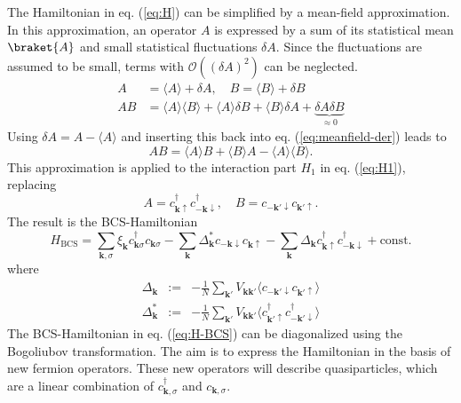 The Hamiltonian in eq. (\ref{eq:H}) can be simplified by a mean-field approximation. In this approximation, an operator $A$ is expressed by a sum of its statistical mean $\braket{A}$ and small statistical fluctuations $\delta A$. Since the fluctuations are assumed to be small, terms with $\mathcal{O}((\delta A)^2)$ can be neglected.
\begin{align}
A &= \langle A \rangle + \delta A, \quad B = \langle B \rangle + \delta B  \nonumber \\
A B &= \langle A \rangle  \langle B \rangle  + \langle A \rangle  \delta B +  \langle B \rangle \delta A + \underbrace{\delta A \delta B}_{\approx 0}\label{eq:meanfield-der}
\end{align}
Using $\delta A = A - \langle A \rangle$ and inserting this back into eq. (\ref{eq:meanfield-der}) leads to
\begin{equation}
AB = \langle A \rangle B + \langle B \rangle A - \langle A \rangle \langle B \rangle.\label{eq:meanfield-ab}
\end{equation}
This approximation is applied to the interaction part $H_1$ in eq. (\ref{eq:H1}), replacing
\begin{equation}
A = c^{\dagger}_{\mathbf{k} \uparrow }c^{\dagger}_{- \mathbf{k} \downarrow}, \quad B =  c_{- \mathbf{k'} \downarrow} c_{\mathbf{k'} \uparrow} .
\end{equation}
The result is the BCS-Hamiltonian
\begin{equation}
H_{\text{BCS}} = \sum_{\mathbf{k}, \sigma} \xi_{\mathbf{k}} c^{\dagger}_{\mathbf{k} \sigma }c_{\mathbf{k} \sigma }    -  \sum_{\mathbf{k}} \Delta_{\mathbf{k}}^* c_{-\mathbf{k} \downarrow} c_{\mathbf{k} \uparrow}  - \sum_{\mathbf{k}} \Delta_{\mathbf{k}}  c^{\dagger}_{\mathbf{k} \uparrow} c^{\dagger}_{- \mathbf{k} \downarrow} + \text{const.}\label{eq:H-BCS}
\end{equation}
where 
\begin{eqnarray}
\Delta_{\mathbf{k}} &:=& - \frac{1}{N} \sum_{\mathbf{k'}} V_\mathbf{{\mathbf{k} \mathbf{k'}}} \langle c_{-\mathbf{k'} \downarrow} c_{\mathbf{k'} \uparrow} \rangle \\
\Delta_{\mathbf{k}}^* &:=& - \frac{1}{N} \sum_{\mathbf{k'}} V_\mathbf{{\mathbf{k} \mathbf{k'}}}  \langle  c^{\dagger}_{\mathbf{k'} \uparrow} c^{\dagger}_{- \mathbf{k'} \downarrow} \rangle
\end{eqnarray}
The BCS-Hamiltonian in eq. (\ref{eq:H-BCS}) can be diagonalized using the Bogoliubov transformation. The aim is to express the Hamiltonian in the basis of new fermion operators. These new operators will describe quasiparticles, which are a linear combination of $c^\dagger_{\mathbf{k}, \sigma}$ and $c_{\mathbf{k}, \sigma}$.
